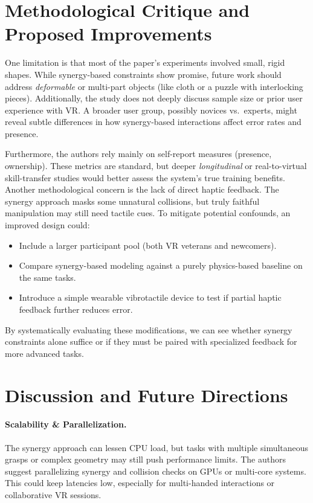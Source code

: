 \documentclass[11pt]{llncs}
\begin{document}
\section*{Methodological Critique and Proposed Improvements}
One limitation is that most of the paper’s experiments involved small, rigid shapes. While synergy-based constraints show promise, future work should address \emph{deformable} or multi-part objects (like cloth or a puzzle with interlocking pieces). Additionally, the study does not deeply discuss sample size or prior user experience with VR. A broader user group, possibly novices vs.\ experts, might reveal subtle differences in how synergy-based interactions affect error rates and presence.

Furthermore, the authors rely mainly on self-report measures (presence, ownership). These metrics are standard, but deeper \emph{longitudinal} or real-to-virtual skill-transfer studies would better assess the system's true training benefits. Another methodological concern is the lack of direct haptic feedback. The synergy approach masks some unnatural collisions, but truly faithful manipulation may still need tactile cues. To mitigate potential confounds, an improved design could:
\begin{itemize}
    \item Include a larger participant pool (both VR veterans and newcomers).
    \item Compare synergy-based modeling against a purely physics-based baseline on the same tasks.
    \item Introduce a simple wearable vibrotactile device to test if partial haptic feedback further reduces error.
\end{itemize}
By systematically evaluating these modifications, we can see whether synergy constraints alone suffice or if they must be paired with specialized feedback for more advanced tasks.

\section*{Discussion and Future Directions}
\paragraph{Scalability \& Parallelization.}
The synergy approach can lessen CPU load, but tasks with multiple simultaneous grasps or complex geometry may still push performance limits. The authors suggest parallelizing synergy and collision checks on GPUs or multi-core systems. This could keep latencies low, especially for multi-handed interactions or collaborative VR sessions.
\end{document}
